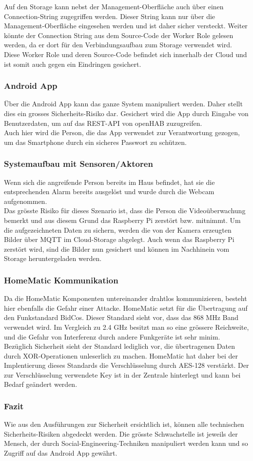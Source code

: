 Auf den Storage kann nebst der Management-Oberfläche auch über einen Connection-String zugegriffen werden. Dieser String kann nur über die Management-Oberfläche eingesehen werden und ist daher sicher versteckt. Weiter könnte der Connection String aus dem Source-Code der Worker Role gelesen werden, da er dort für den Verbindungsaufbau zum Storage verwendet wird. Diese Worker Role und deren Source-Code befindet sich innerhalb der Cloud und ist somit auch gegen ein Eindringen gesichert. \\

\subsubsection{Android App}
Über die Android App kann das ganze System manipuliert werden. Daher stellt dies ein grosses Sicherheits-Risiko dar. Gesichert wird die App durch Eingabe von Benutzerdaten, um auf das REST-API von openHAB zuzugreifen. \\
Auch hier wird die Person, die das App verwendet zur Verantwortung gezogen, um das Smartphone durch ein sicheres Passwort zu schützen.

\subsubsection{Systemaufbau mit Sensoren/Aktoren}
Wenn sich die angreifende Person bereits im Haus befindet, hat sie die entsprechenden Alarm bereits ausgelöst und wurde durch die Webcam aufgenommen. \\
Das grösste Risiko für dieses Szenario ist, dass die Person die Videoüberwachung bemerkt und aus diesem Grund das Raspberry Pi zerstört bzw. mitnimmt. Um die aufgezeichneten Daten zu sichern, werden die von der Kamera erzeugten Bilder über MQTT im Cloud-Storage abgelegt. Auch wenn das Raspberry Pi zerstört wird, sind die Bilder nun gesichert und können im Nachhinein vom Storage heruntergeladen werden.

\subsubsection{HomeMatic Kommunikation}
Da die HomeMatic Komponenten untereinander drahtlos kommunizieren, besteht hier ebenfalls die Gefahr einer Attacke. HomeMatic setzt für die Übertragung auf den Funkstandard BidCos. Dieser Standard sieht vor, dass das 868 MHz Band verwendet wird. Im Vergleich zu 2.4 GHz besitzt man so eine grössere Reichweite, und die Gefahr von Interferenz durch andere Funkgeräte ist sehr minim.\\
Bezüglich Sicherheit sieht der Standard lediglich vor, die übertragenen Daten durch XOR-Operationen unleserlich zu machen. HomeMatic hat daher bei der Implentierung dieses Standards die Verschlüsselung durch AES-128 verstärkt. Der zur Verschlüsselung verwendete Key ist in der Zentrale hinterlegt und kann bei Bedarf geändert werden.


\subsubsection{Fazit}
Wie aus den Ausführungen zur Sicherheit ersichtlich ist, können alle technischen Sicherheits-Risiken abgedeckt werden. Die grösste Schwachstelle ist jeweils der Mensch, der durch Social-Engineering-Techniken manipuliert werden kann und so Zugriff auf das Android App gewährt.